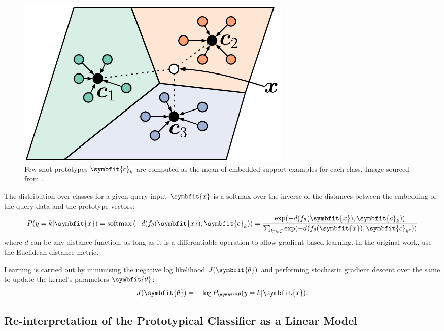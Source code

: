 \begin{figure}[ht]
    \centering
    \includegraphics[scale=0.85]{chapters/assets/fsl/prototype_fewshot_v3.pdf}
    \caption{Few-shot prototypes $\symbfit{c}_k$ are computed as the mean of embedded support examples for each class. Image sourced from \parencite{Snell2017PrototypicalLearning}.}
    \label{fig:protonets}
\end{figure}

The distribution over classes for a given query input $\symbfit{x}$ is a softmax over the inverse of the distances between the embedding of the query data and the prototype vectors:
\begin{equation}
    P(y=k\vert\symbfit{x})=\operatorname{softmax}\left(-d(f_\theta(\symbfit{x}), \symbfit{c}_k)\right) = \frac{\exp(-d(f_\theta(\symbfit{x}), \symbfit{c}_k))}{\sum_{k^\prime \in \mathcal{C}}\exp(-d(f_\theta(\symbfit{x}), \symbfit{c}_{k^\prime}))}
    \label{eqn:fsl-proto-classification}
\end{equation}
where $d$ can be any distance function, as long as it is a differentiable operation to allow gradient-based learning. In the original work, \textcite{Snell2017PrototypicalLearning} use the Euclidean distance metric.

Learning is carried out by minimising the negative log likelihood $J(\symbfit{\theta})$ and performing stochastic gradient descent over the same to update the kernel's parameters $\symbfit{\theta}$:
\begin{equation}
    J(\symbfit{\theta})=-\log P_{\symbfit \theta}(y=k \vert \symbfit{x}).
\end{equation}

\subsection{Re-interpretation of the Prototypical Classifier as a Linear Model}\label{ssec:proto-reint-linmodel}

